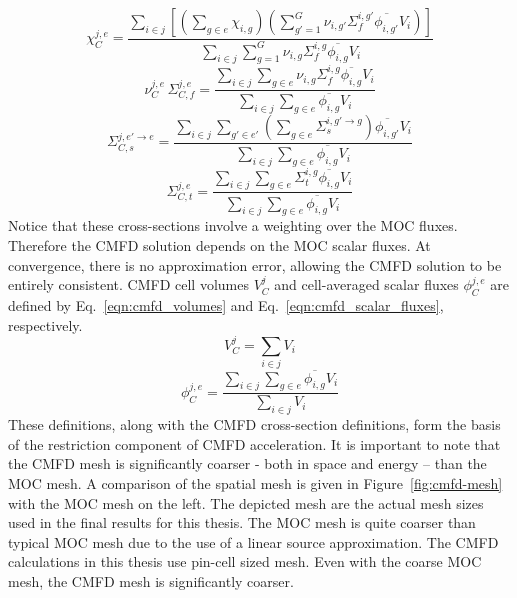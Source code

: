 \begin{equation}
\chi_C^{j,e} = \frac{\sum_{i \in j} \left[ \left(\sum_{g \in e} \chi_{i,g} \right) \left(\sum_{g'=1}^{G} \nu_{i, g'} \Sigma_f^{i,g'} \overline{\phi_{i,g'}} V_i \right)\right]}{\sum_{i \in j} \sum_{g=1}^{G} \nu_{i, g} \Sigma_f^{i,g} \overline{\phi_{i,g}} V_i}
\label{eqn:cmfd-xs-chi}
\end{equation}
\begin{equation}
\nu_C^{j,e} \, \Sigma_{C,f}^{j,e} = \frac{\sum_{i \in j} \sum_{g \in e} \nu_{i, g} \Sigma_f^{i,g} \overline{\phi_{i,g}} V_i}{\sum_{i \in j} \sum_{g \in e} \overline{\phi_{i,g}} V_i}
\end{equation}
\begin{equation}
\Sigma_{C,s}^{j, e' \rightarrow e} = \frac{\sum_{i \in j} \sum_{g'\in e'} \left(\sum_{g \in e} \Sigma_{s}^{i, g' \rightarrow g} \right) \overline{\phi_{i,g'}} V_i}{\sum_{i \in j} \sum_{g\in e} \overline{\phi_{i,g}} V_i}
\end{equation}
\begin{equation}
\Sigma_{C,t}^{j, e} = \frac{\sum_{i \in j} \sum_{g \in e} \Sigma_{t}^{i, g} \overline{\phi_{i,g}} V_i}{\sum_{i \in j} \sum_{g\in e} \overline{\phi_{i,g}} V_i}
\label{eqn:cmfd-xs-total}
\end{equation}
Notice that these cross-sections involve a weighting over the \ac{MOC} fluxes. Therefore the \ac{CMFD} solution depends on the \ac{MOC} scalar fluxes. At convergence, there is no approximation error, allowing the \ac{CMFD} solution to be entirely consistent. \ac{CMFD} cell volumes $V_C^j$ and cell-averaged scalar fluxes $\phi_C^{j,e}$ are defined by Eq.~\ref{eqn:cmfd_volumes} and Eq.~\ref{eqn:cmfd_scalar_fluxes}, respectively.
\begin{equation}
V_C^j = \sum_{i \in j} V_i
\label{eqn:cmfd_volumes}
\end{equation}
\begin{equation}
\phi_C^{j,e} = \frac{\sum_{i \in j} \sum_{g \in e} \overline{\phi_{i,g}} V_i}{\sum_{i \in j} V_i}
\label{eqn:cmfd_scalar_fluxes}
\end{equation}
These definitions, along with the \ac{CMFD} cross-section definitions, form the basis of the restriction component of \ac{CMFD} acceleration. It is important to note that the \ac{CMFD} mesh is significantly coarser - both in space and energy -- than the \ac{MOC} mesh. A comparison of the spatial mesh is given in Figure~\ref{fig:cmfd-mesh} with the \ac{MOC} mesh on the left. The depicted mesh are the actual mesh sizes used in the final results for this thesis. The \ac{MOC} mesh is quite coarser than typical \ac{MOC} mesh due to the use of a linear source approximation. The \ac{CMFD} calculations in this thesis use pin-cell sized mesh. Even with the coarse \ac{MOC} mesh, the \ac{CMFD} mesh is significantly coarser.
